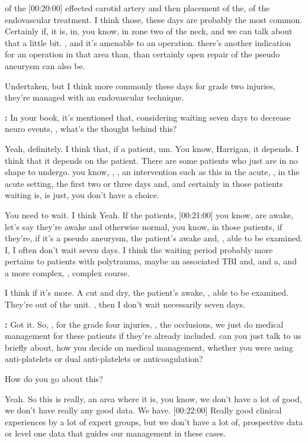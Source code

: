 \documentclass[
]{book}
\begin{document}
of the {[}00:20:00{]} effected carotid artery and then placement of the, of
the endovascular treatment. I think those, these days are probably
the most common. Certainly if, it is, in, you know, in zone two of
the neck, and we can talk about that a little bit. , and it's amenable
to an operation. there's another indication for an operation in that
area than, than certainly open repair of the pseudo aneurysm can also
be.

Undertaken, but I think more commonly these days for grade two injuries,
they're managed with an endovascular technique.

\textbf{:} In your book,
it's mentioned that, considering waiting seven days to decrease
neuro events, , what's the thought behind this?

Yeah,
definitely. I think that, if a patient, um. You know, Harrigan, it
depends. I think that it depends on the patient. There are some patients
who just are in no shape to undergo. you know, , , an intervention
such as this in the acute, , in the acute setting, the first two or
three days and, and certainly in those patients waiting is, is just, you
don't have a choice.

You need to wait. I think Yeah. If the patients, {[}00:21:00{]} you
know, are awake, let's say they're awake and otherwise normal, you
know, in those patients, if they're, if it's a pseudo aneurysm, the
patient's awake and, , able to be examined. I, I often don't wait seven
days. I think the waiting period probably more pertains to patients with
polytrauma, maybe an associated TBI and, and a, and a more complex, ,
complex course.

I think if it's more. A cut and dry, the patient's awake, , able to be
examined. They're out of the unit. , then I don't wait necessarily seven
days.

\textbf{:} Got it. So, , for
the grade four injuries, , the occlusions, we just do medical management
for these patients if they're already included. can you just talk to us
briefly about, how you decide on medical management, whether you were
using anti-platelets or dual anti-platelets or anticoagulation?

How do you go about this?

Yeah. So this
is really, an area where it is, you know, we don't have a lot of
good, we don't have really any good data. We have. {[}00:22:00{]} Really
good clinical experiences by a lot of expert groups, but we don't have a
lot of, prospective data or level one data that guides our
management in these cases.
\end{document}
